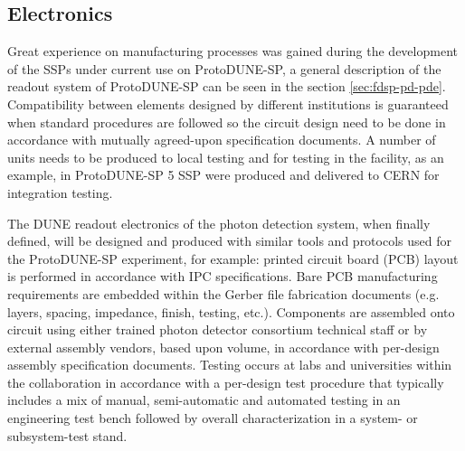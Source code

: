 \subsection{Electronics}
\label{sec:fdsp-pd-assy-pde}

Great experience on manufacturing processes was gained during the development of the SSPs under current use on ProtoDUNE-SP, a general description of the readout system of ProtoDUNE-SP can be seen in the section \ref{sec:fdsp-pd-pde}. Compatibility between elements designed by different institutions is guaranteed when standard procedures are followed so the circuit design need to be done in accordance with mutually agreed-upon specification documents. A number of units needs to be produced to local testing and for testing in the facility, as an example, in ProtoDUNE-SP \num{5} SSP were produced and delivered to CERN for integration testing.

The DUNE readout electronics of the photon detection system, when finally defined, will be designed and produced with similar tools and protocols used for the ProtoDUNE-SP experiment, for example: printed circuit board (PCB) layout is performed in accordance with IPC specifications. Bare PCB manufacturing requirements are embedded within the Gerber file fabrication documents (e.g. layers, spacing, impedance, finish, testing, etc.). Components are assembled onto circuit using either trained photon detector consortium technical staff or by external assembly vendors, based upon volume, in accordance with per-design assembly specification documents. Testing occurs at labs and universities within the collaboration in accordance with a per-design test procedure that typically includes a mix of manual, semi-automatic and automated testing in an engineering test bench followed by overall characterization in a system- or subsystem-test stand.


